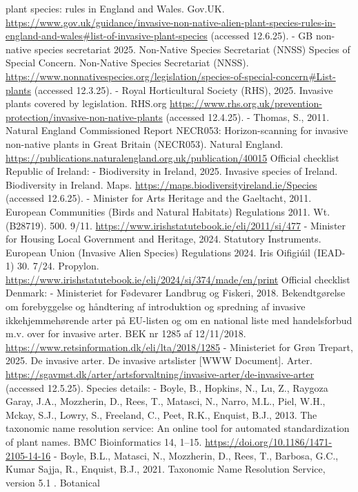 \documentclass[
]{article}
\begin{document}
plant species: rules in England and Wales. Gov.UK.
\url{https://www.gov.uk/guidance/invasive-non-native-alien-plant-species-rules-in-england-and-wales\#list-of-invasive-plant-species}
(accessed 12.6.25). - GB non-native species secretariat 2025. Non-Native
Species Secretariat (NNSS) Species of Special Concern. Non-Native
Species Secretariat (NNSS).
\url{https://www.nonnativespecies.org/legislation/species-of-special-concern\#List-plants}
(accessed 12.3.25). - Royal Horticultural Society (RHS), 2025. Invasive
plants covered by legislation. RHS.org
\url{https://www.rhs.org.uk/prevention-protection/invasive-non-native-plants}
(accessed 12.4.25). - Thomas, S., 2011. Natural England Commissioned
Report NECR053: Horizon-scanning for invasive non-native plants in Great
Britain (NECR053). Natural England.
\url{https://publications.naturalengland.org.uk/publication/40015}
Official checklist Republic of Ireland: - Biodiversity in Ireland, 2025.
Invasive species of Ireland. Biodiversity in Ireland. Maps.
\url{https://maps.biodiversityireland.ie/Species} (accessed 12.6.25). -
Minister for Arts Heritage and the Gaeltacht, 2011. European Communities
(Birds and Natural Habitats) Regulations 2011. Wt. (B28719). 500. 9/11.
\url{https://www.irishstatutebook.ie/eli/2011/si/477} - Minister for
Housing Local Government and Heritage, 2024. Statutory Instruments.
European Union (Invasive Alien Species) Regulations 2024. Iris Oifigiúil
(IEAD-1) 30. 7/24. Propylon.
\url{https://www.irishstatutebook.ie/eli/2024/si/374/made/en/print}
Official checklist Denmark: - Ministeriet for Fødevarer Landbrug og
Fiskeri, 2018. Bekendtgørelse om forebyggelse og håndtering af
introduktion og spredning af invasive ikkehjemmehørende arter på
EU-listen og om en national liste med handelsforbud m.v. over for
invasive arter. BEK nr 1285 af 12/11/2018.
\url{https://www.retsinformation.dk/eli/lta/2018/1285} - Ministeriet for
Grøn Trepart, 2025. De invasive arter. De invasive artslister {[}WWW
Document{]}. Arter.
\url{https://sgavmst.dk/arter/artsforvaltning/invasive-arter/de-invasive-arter}
(accessed 12.5.25). Species details: - Boyle, B., Hopkins, N., Lu, Z.,
Raygoza Garay, J.A., Mozzherin, D., Rees, T., Matasci, N., Narro, M.L.,
Piel, W.H., Mckay, S.J., Lowry, S., Freeland, C., Peet, R.K., Enquist,
B.J., 2013. The taxonomic name resolution service: An online tool for
automated standardization of plant names. BMC Bioinformatics 14, 1--15.
\url{https://doi.org/10.1186/1471-2105-14-16} - Boyle, B.L., Matasci,
N., Mozzherin, D., Rees, T., Barbosa, G.C., Kumar Sajja, R., Enquist,
B.J., 2021. Taxonomic Name Resolution Service, version 5.1 . Botanical
\end{document}
